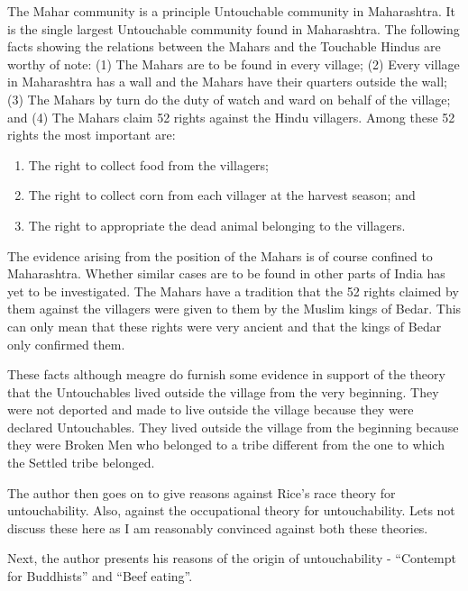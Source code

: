 \documentclass{article}
\begin{document}
\begin{shadequote}
The Mahar community is a principle Untouchable community in Maharashtra. It is the single largest Untouchable community found in Maharashtra. The following facts showing the relations between the Mahars and the Touchable Hindus are worthy of note: (1) The Mahars are to be found in every village; (2) Every village in Maharashtra has a wall and the Mahars have their quarters outside the wall; (3) The Mahars by turn do the duty of watch and ward on behalf of the village; and (4) The Mahars claim 52 rights against the Hindu villagers. Among these 52 rights the most important are:
\begin{enumerate}
\item The right to collect food from the villagers;
\item The right to collect corn from each villager at the harvest season; and
\item The right to appropriate the dead animal belonging to the villagers.
\end{enumerate}

The evidence arising from the position of the Mahars is of course confined to Maharashtra. Whether similar cases are to be found in other parts of India has yet to be investigated.
The Mahars have a tradition that the 52 rights claimed by them against the villagers were given to them by the Muslim kings of Bedar. This can only mean that these rights were very ancient and that the kings of Bedar only confirmed them.

These facts although meagre do furnish some evidence in support of the theory that the Untouchables lived outside the village from the very beginning. They were not deported and made to live outside the village because they were declared Untouchables. They lived outside the village from the beginning because they were Broken Men who belonged to a tribe different from the one to which the Settled tribe belonged.
\end{shadequote}

The author then goes on to give reasons against Rice's race theory for untouchability\cite{stanleyrice1}. Also, against the occupational theory for untouchability. Lets not discuss these here as I am reasonably convinced against both these theories.

Next, the author presents his reasons of the origin of untouchability - ``Contempt for Buddhists'' and ``Beef eating''.

\end{document}
